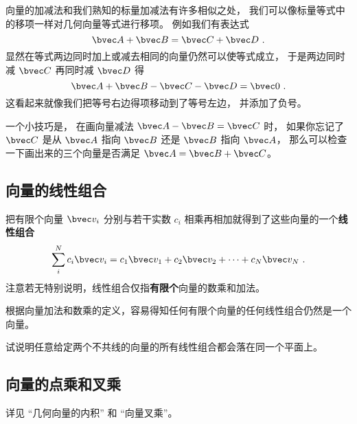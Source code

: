 向量的加减法和我们熟知的标量加减法有许多相似之处， 我们可以像标量等式中的移项一样对几何向量等式进行移项。 例如我们有表达式
\begin{equation}
\bvec A + \bvec B = \bvec C + \bvec D~.
\end{equation}
显然在等式两边同时加上或减去相同的向量仍然可以使等式成立， 于是两边同时减 $\bvec C$ 再同时减 $\bvec D$ 得
\begin{equation}
\bvec A + \bvec B - \bvec C - \bvec D = \bvec 0~.
\end{equation}
这看起来就像我们把等号右边得项移动到了等号左边， 并添加了负号。

一个小技巧是， 在画向量减法 $\bvec A - \bvec B = \bvec C$ 时， 如果你忘记了 $\bvec C$ 是从 $\bvec A$ 指向 $\bvec B$ 还是 $\bvec B$ 指向 $\bvec A$， 那么可以检查一下画出来的三个向量是否满足 $\bvec A = \bvec B + \bvec C$。


\subsection{向量的线性组合}
把有限个向量 $\bvec v_i$ 分别与若干实数 $c_i$ 相乘再相加就得到了这些向量的一个\textbf{线性组合}
\begin{equation}\label{eq_GVecOp_1}
\sum_i^N c_i \bvec v_i = c_1\bvec v_1 + c_2\bvec v_2 +\dots +c_N \bvec v_N~.
\end{equation}
注意若无特别说明，线性组合仅指\textbf{有限个}向量的数乘和加法。

根据向量加法和数乘的定义，容易得知任何有限个向量的任何线性组合仍然是一个向量。

\begin{exercise}{}
试说明任意给定两个不共线的向量的所有线性组合都会落在同一个平面上。
\end{exercise}

\subsection{向量的点乘和叉乘}
详见 “几何向量的内积” 和 “向量叉乘”。
